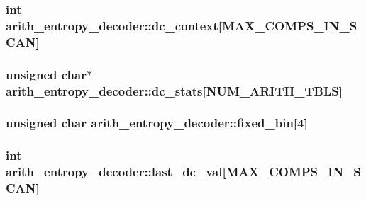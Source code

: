 \subsubsection[{dc\+\_\+context}]{\setlength{\rightskip}{0pt plus 5cm}int arith\+\_\+entropy\+\_\+decoder\+::dc\+\_\+context\mbox{[}{\bf M\+A\+X\+\_\+\+C\+O\+M\+P\+S\+\_\+\+I\+N\+\_\+\+S\+C\+A\+N}\mbox{]}}\label{structarith__entropy__decoder_a0b9a2123aec7d879cff09e315530d5e8}
\hypertarget{structarith__entropy__decoder_a0a8fd2a17e1e838e9194fab8579463d5}{}
\subsubsection[{dc\+\_\+stats}]{\setlength{\rightskip}{0pt plus 5cm}unsigned char$\ast$ arith\+\_\+entropy\+\_\+decoder\+::dc\+\_\+stats\mbox{[}{\bf N\+U\+M\+\_\+\+A\+R\+I\+T\+H\+\_\+\+T\+B\+L\+S}\mbox{]}}\label{structarith__entropy__decoder_a0a8fd2a17e1e838e9194fab8579463d5}
\hypertarget{structarith__entropy__decoder_a3e88e1dc54dd33d41dd937a8dc03342a}{}
\subsubsection[{fixed\+\_\+bin}]{\setlength{\rightskip}{0pt plus 5cm}unsigned char arith\+\_\+entropy\+\_\+decoder\+::fixed\+\_\+bin\mbox{[}4\mbox{]}}\label{structarith__entropy__decoder_a3e88e1dc54dd33d41dd937a8dc03342a}
\hypertarget{structarith__entropy__decoder_afd8cad23cfc049f4ae748308f239bb20}{}
\subsubsection[{last\+\_\+dc\+\_\+val}]{\setlength{\rightskip}{0pt plus 5cm}int arith\+\_\+entropy\+\_\+decoder\+::last\+\_\+dc\+\_\+val\mbox{[}{\bf M\+A\+X\+\_\+\+C\+O\+M\+P\+S\+\_\+\+I\+N\+\_\+\+S\+C\+A\+N}\mbox{]}}\label{structarith__entropy__decoder_afd8cad23cfc049f4ae748308f239bb20}
\hypertarget{structarith__entropy__decoder_a26f1da810c05744076bad3072983d0d1}{}
